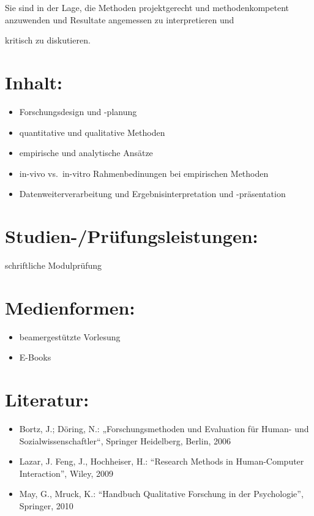 Sie sind in der Lage, die Methoden projektgerecht und methodenkompetent
anzuwenden und Resultate angemessen zu interpretieren und

kritisch zu diskutieren.

\section*{Inhalt:}\label{inhalt-3}

\begin{itemize}
\tightlist
\item
  Forschungsdesign und -planung
\item
  quantitative und qualitative Methoden
\item
  empirische und analytische Ansätze
\item
  in-vivo vs.~in-vitro Rahmenbedinungen bei empirischen Methoden
\item
  Datenweiterverarbeitung und Ergebnisinterpretation und -präsentation
\end{itemize}

\section*{Studien-/Prüfungsleistungen:}\label{studien-pruxfcfungsleistungen-3}

schriftliche Modulprüfung

\section*{Medienformen:}\label{medienformen-3}

\begin{itemize}
\tightlist
\item
  beamergestützte Vorlesung
\item
  E-Books
\end{itemize}

\section*{Literatur:}\label{literatur-3}

\begin{itemize}
\tightlist
\item
  Bortz, J.; Döring, N.: „Forschungsmethoden und Evaluation für Human-
  und Sozialwissenschaftler``, Springer Heidelberg, Berlin, 2006
\item
  Lazar, J. Feng, J., Hochheiser, H.: ``Research Methods in
  Human-Computer Interaction'', Wiley, 2009
\item
  May, G., Mruck, K.: ``Handbuch Qualitative Forschung in der
  Psychologie'', Springer, 2010
\end{itemize}

